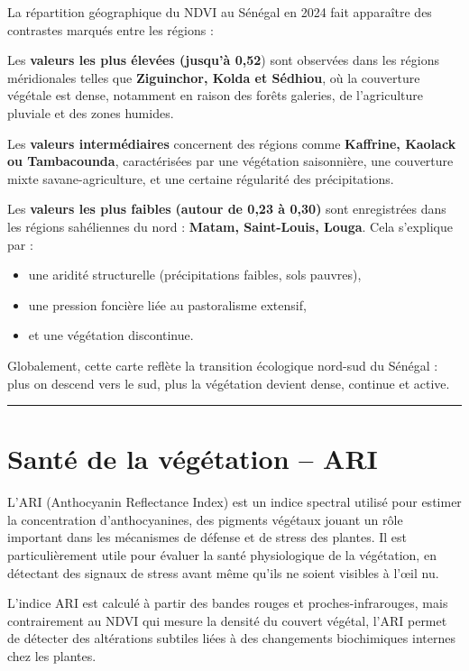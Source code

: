 \documentclass[
]{book}
\begin{document}
La répartition géographique du NDVI au Sénégal en 2024 fait apparaître des contrastes marqués entre les régions :

Les \textbf{valeurs les plus élevées (jusqu'à 0,52}) sont observées dans les régions méridionales telles que \textbf{Ziguinchor, Kolda et Sédhiou}, où la couverture végétale est dense, notamment en raison des forêts galeries, de l'agriculture pluviale et des zones humides.

Les \textbf{valeurs intermédiaires} concernent des régions comme \textbf{Kaffrine, Kaolack ou Tambacounda}, caractérisées par une végétation saisonnière, une couverture mixte savane-agriculture, et une certaine régularité des précipitations.

Les \textbf{valeurs les plus faibles} \textbf{(autour de 0,23 à 0,30)} sont enregistrées dans les régions sahéliennes du nord : \textbf{Matam, Saint-Louis, Louga}. Cela s'explique par :

\begin{itemize}
\item
  une aridité structurelle (précipitations faibles, sols pauvres),
\item
  une pression foncière liée au pastoralisme extensif,
\item
  et une végétation discontinue.
\end{itemize}

Globalement, cette carte reflète la transition écologique nord-sud du Sénégal : plus on descend vers le sud, plus la végétation devient dense, continue et active.

\begin{center}\rule{0.5\linewidth}{0.5pt}\end{center}

\section{Santé de la végétation -- ARI}\label{santuxe9-de-la-vuxe9guxe9tation-ari}

L'ARI (Anthocyanin Reflectance Index) est un indice spectral utilisé pour estimer la concentration d'anthocyanines, des pigments végétaux jouant un rôle important dans les mécanismes de défense et de stress des plantes. Il est particulièrement utile pour évaluer la santé physiologique de la végétation, en détectant des signaux de stress avant même qu'ils ne soient visibles à l'œil nu.

L'indice ARI est calculé à partir des bandes rouges et proches-infrarouges, mais contrairement au NDVI qui mesure la densité du couvert végétal, l'ARI permet de détecter des altérations subtiles liées à des changements biochimiques internes chez les plantes.
\end{document}
